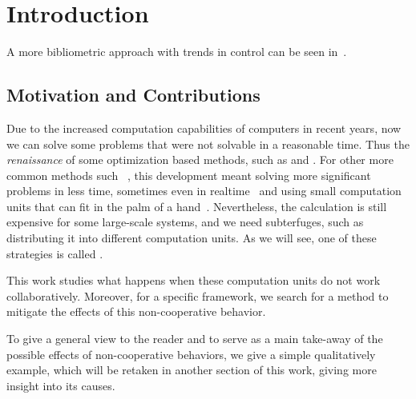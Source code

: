\documentclass[../main.tex]{subfiles}
\begin{document}
\chapter{Introduction}\label{cha:introduction}

\cite{DibajiEtAl2019}

A more bibliometric approach with trends in control can be seen in~\cite{ZacchiaEtAl2019}.

\section{Motivation and Contributions}
Due to the increased computation capabilities of computers in recent years, now we can solve some problems that were not solvable in a reasonable time.
Thus the \emph{renaissance} of some optimization based methods, such as  and .
For other more common methods such \mpc~\cite{GarciaEtAl1989}, this development meant solving more significant problems in less time, sometimes even in realtime~ and using small computation units that can fit in the palm of a hand~\cite{BanguraMahony2014}.
Nevertheless, the calculation is still expensive for some large-scale systems, and we need subterfuges, such as distributing it into different computation units.
As we will see, one of these strategies is called \dmpc.

This work studies what happens when these computation units do not work collaboratively.
Moreover, for a specific \dmpc{} framework, we search for a method to mitigate the effects of this non-cooperative behavior.

To give a general view to the reader and to serve as a main take-away of the possible effects of non-cooperative behaviors, we give a simple qualitatively example, which will be retaken in another section of this work, giving more insight into its causes.
\end{document}
